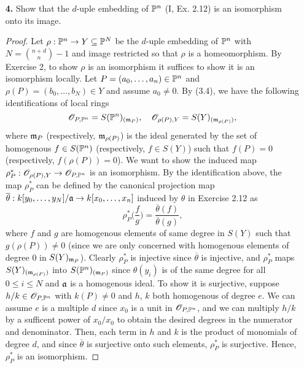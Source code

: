 \documentclass{article}
\begin{document}
\begin{enumerate} [label=\textbf{\arabic*.}, leftmargin=-0.05em]
\item[\textbf{4.}] Show that the $d$-uple embedding of $\mathbb{P}^n$ (I, Ex. 2.12) is an isomorphism onto its image.

\begin{proof}
   Let $\rho : \mathbb{P}^n \to Y \subseteq \mathbb{P}^N$ be the $d$-uple embedding of $\mathbb{P}^n$ with $N = {n + d \choose n} - 1$ and image restricted so that $\rho$ is a homeomorphism.
   By Exercise 2, to show $\rho$ is an isomorphism it suffices to show it is an isomorphism locally.
   Let $P = (a_0, \dots, a_n) \in \mathbb{P}^n$ and $\rho(P) = (b_0, \dots, b_N) \in Y$ and assume $a_0 \neq 0$.
   By (3.4), we have the following identifications of local rings
   \begin{equation*}
        \mathscr{O}_{P, \mathbb{P}^n} = S(\mathbb{P}^n)_{(\mathfrak{m}_P)}, \quad \mathscr{O}_{\rho(P), Y} = S(Y)_{(\mathfrak{m}_{\rho(P)})},
   \end{equation*}
   where $\mathfrak{m}_P$ (respectively, $\mathfrak{m}_{\rho(P)}$) is the ideal generated by the set of homogenous $f \in S(\mathbb{P}^n)$ (respectively, $f \in S(Y)$) such that $f(P) = 0$ (respectively, $f(\rho(P)) = 0$).
   We want to show the induced map $\rho_P^* : \mathscr{O}_{\rho(P), Y} \to \mathscr{O}_{P, \mathbb{P}^n}$ is an isomorphism.
   By the identification above, the map $\rho_P^*$ can be defined by the canonical projection map $\overline{\theta} : k[y_0, \dots, y_N] / \mathfrak{a} \to k[x_0, \dots, x_n]$ induced by $\theta$ in Exercise 2.12 as
   \begin{equation*}
        \rho_P^*\bigg( \frac{f}{g} \bigg) = \frac{\overline{\theta}(f)}{\overline{\theta}(g)},
   \end{equation*}
   where $f$ and $g$ are homogenous elements of same degree in $S(Y)$ such that $g(\rho(P)) \neq 0$ (since we are only concerned with homogenous elements of degree $0$ in $S(Y)_{\mathfrak{m}_P}$).
   Clearly $\rho_P^*$ is injective since $\overline{\theta}$ is injective, and $\rho_P^*$ maps $S(Y)_{(\mathfrak{m}_{\rho(P)})}$ into $S(\mathbb{P}^n)_{(\mathfrak{m}_P)}$ since $\theta(y_i)$ is of the same degree for all $0 \leq i \leq N$ and $\mathfrak{a}$ is a homogenous ideal.
   To show it is surjective, suppose $h / k \in \mathscr{O}_{P, \mathbb{P}^n}$ with $k(P) \neq 0$ and $h$, $k$ both homogenous of degree $e$.
   We can assume $e$ is a multiple $d$ since $x_0$ is a unit in $\mathscr{O}_{P, \mathbb{P}^n}$, and we can multiply $h / k$ by a sufficent power of $x_0 / x_0$ to obtain the desired degrees in the numerator and denominator.
   Then, each term in $h$ and $k$ is the product of monomials of degree $d$, and since $\overline{\theta}$ is surjective onto such elements, $\rho_P^*$ is surjective. Hence, $\rho_P^*$ is an isomorphism.
\end{proof}


\end{enumerate}
\end{document}
